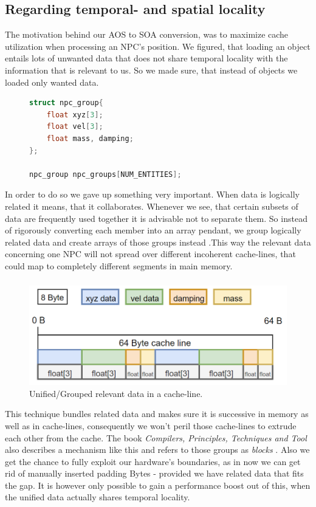 \subsection{Regarding temporal- and spatial locality}\label{rtasl}
The motivation behind our AOS to SOA conversion, was to maximize cache utilization when processing an NPC's position. We figured, that loading an object entails lots of unwanted data that does not share temporal locality with the information that is relevant to us. So we made sure, that instead of objects we loaded only wanted data.
\begin{figure}
\begin{lstlisting}[language=C++,numbers=none,name={Consolidating related data},label={component_npc}]
struct npc_group{
	float xyz[3];
	float vel[3];
	float mass, damping;
};

npc_group npc_groups[NUM_ENTITIES];
\end{lstlisting}
\end{figure}
In order to do so we gave up something very important. When data is logically related it means, that it collaborates. Whenever we see, that certain subsets of data are frequently used together it is advisable not to separate them. So instead of rigorously converting each member into an array pendant, we group logically related data and create arrays of those groups instead .This way the relevant data concerning one NPC will not spread over different incoherent cache-lines, that could map to completely different segments in main memory.
\subsubsection{}
\vspace{-1cm}
\begin{figure}
	\vspace{-0.4cm}
	\centering
	\includegraphics[width=.37\textwidth, height=0.17\textwidth]{PICs/CacheUtilizationNPCComp}
	\caption{Unified/Grouped relevant data in a cache-line.}\label{cache_utilization_comp}
\end{figure}
This technique bundles related data and makes sure it is successive in memory as well as in cache-lines, consequently we won't peril those cache-lines to extrude each other from the cache. The book \textit{Compilers, Principles, Techniques and Tool} also describes a mechanism like this and refers to those groups as \textit{blocks} .
Also we get the chance to fully exploit our hardware's boundaries, as in now we can get rid of manually inserted padding Bytes  - provided we have related data that fits the gap. It is however only possible to gain a performance boost out of this, when the unified data actually shares temporal locality.

